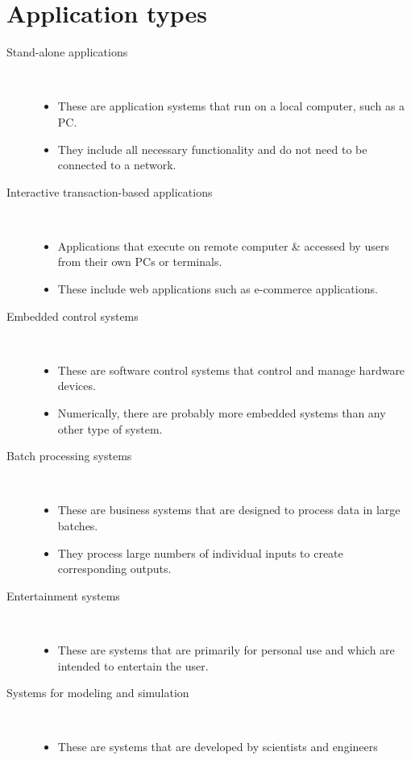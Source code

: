 \documentclass{report}
\begin{document}
\section{Application types}
\begin{description}
  \item [Stand-alone applications] \
  \begin{itemize}
    \item These are application systems that run on a local computer, such as a PC.
    \item They include all necessary functionality and do not need to be connected to a
network.
  \end{itemize}
  \item [Interactive transaction-based applications] \
  \begin{itemize}
    \item Applications that execute on remote computer \& accessed by users from
their own PCs or terminals.
	\item These include web applications such as e-commerce applications.
  \end{itemize}
  \item [Embedded control systems] \
  \begin{itemize}
    \item These are software control systems that control and manage hardware devices.
    \item Numerically, there are probably more embedded systems than any other type of
system.
  \end{itemize}
  \item [Batch processing systems] \
  \begin{itemize}
    \item These are business systems that are designed to process data in
large batches.
    \item They process large numbers of individual inputs to create
corresponding outputs.
  \end{itemize}
  \item [Entertainment systems] \
  \begin{itemize}
    \item These are systems that are primarily for personal use and which
are intended to entertain the user.
  \end{itemize}
  \item [Systems for modeling and simulation] \
  \begin{itemize}
    \item These are systems that are developed by scientists and engineers

\end{itemize}
\end{description}
\end{document}
